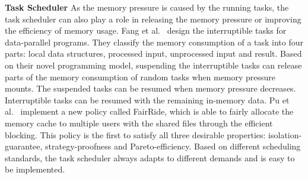\textbf{Task Scheduler} As the memory pressure is caused by the running tasks, the task scheduler can also play a role in releasing the memory pressure or improving the efficiency of memory usage. Fang et al.~\cite{fang2015interruptible} design the interruptible tasks for data-parallel programs. They classify the memory consumption of a task into four parts: local data structures, processed input, unprocessed input and result. Based on their novel programming model, suspending the interruptible tasks can release parts of the memory consumption of random tasks when memory pressure mounts. The suspended tasks can be resumed when memory pressure decreases. Interruptible tasks can be resumed with the remaining in-memory data. Pu et al.~\cite{pu2016fairride} implement a new policy called FairRide, which  is able to fairly allocate the memory cache to multiple users with the shared files through the efficient blocking. This policy is the first to satisfy all three desirable properties: isolation-guarantee, strategy-proofness and Pareto-efficiency. Based on different scheduling standards, the task scheduler always adapts to different demands and is easy to be implemented.
